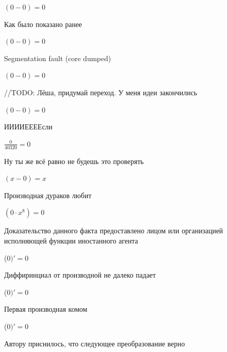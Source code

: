 \documentclass[12pt,a4paper,fleqn]{article}
\begin{document}
\begin{center}
\begin{center}
\begin{center}
\begin{center}
\begin{center}
\begin{center}
\begin{center}
\begin{center}
\begin{center}
\begin{center}
\begin{center}
\begin{center}
\begin{center}
\begin{center}
\begin{center}
\begin{center}
\begin{center}
\begin{center}
\begin{center}
\begin{center}
\begin{center}
\begin{center}
\begin{center}
\begin{center}
\begin{center}
\begin{center}
\begin{center}
\begin{center}
\begin{center}
\begin{center}$(0-0) = 0$\end{center}
Как было показано ранее

\begin{center}
\begin{center}$(0-0) = 0$\end{center}
Segmentation fault (core dumped)

\begin{center}
\begin{center}$(0-0) = 0$\end{center}
//TODO: Лёша, придумай переход. У меня идеи закончились

\begin{center}
\begin{center}$(0-0) = 0$\end{center}
ИИИИЕЕЕЕсли\cite{link3}

\begin{center}
\begin{center}$\frac{0}{40320} = 0$\end{center}
Ну ты же всё равно не будешь это проверять

\begin{center}
$(x-0) = x$\end{center}
Производная дураков любит\cite{link2}

\begin{center}
$(0 \cdot x^{8}) = 0$\end{center}
Доказательство данного факта предоставлено лицом или организацией исполняющей функции иностанного агента

\begin{center}
 ($0)'
  = 0$\end{center}
Диффиринциал от производной не далеко падает\cite{link2}

\begin{center}
 ($0)'
  = 0$\end{center}
Первая производная комом\cite{link2}

\begin{center}
 ($0)'
  = 0$\end{center}
Автору приснилось, что следующее преобразование верно


\end{center}
\end{center}
\end{center}
\end{center}
\end{center}
\end{center}
\end{center}
\end{center}
\end{center}
\end{center}
\end{center}
\end{center}
\end{center}
\end{center}
\end{center}
\end{center}
\end{center}
\end{center}
\end{center}
\end{center}
\end{center}
\end{center}
\end{center}
\end{center}
\end{center}
\end{center}
\end{center}
\end{center}
\end{center}
\end{center}
\end{center}
\end{center}
\end{center}
\end{document}
